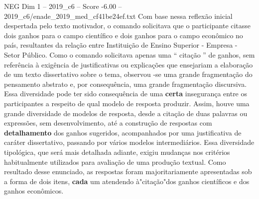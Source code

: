 \begin{textsample}{NEG Dim 1 – 2019\_c6 – Score -6.00 – 2019\_c6/enade\_2019\_med\_cf41be24ef.txt}
Com base nessa reflexão inicial despertada pelo texto motivador, o comando solicitava que o participante citasse dois ganhos para o campo científico e dois ganhos para o campo econômico no país, resultantes da relação entre Instituição de Ensino Superior - Empresa - Setor Público.
Como o comando solicitava apenas uma “ citação ” de ganhos, sem referência à exigência de justificativas ou explicações que ensejariam a elaboração de um texto dissertativo sobre o tema, observou -se uma grande fragmentação do pensamento abstrato e, por consequência, uma grande fragmentação discursiva.
Essa diversidade pode ter sido consequência de uma \textbf{certa} insegurança entre os participantes a respeito de qual modelo de resposta produzir.
Assim, houve uma grande diversidade de modelos de resposta, desde a citação de duas palavras ou expressões, sem desenvolvimento, até a construção de respostas com \textbf{detalhamento} dos ganhos sugeridos, acompanhados por uma justificativa de caráter dissertativo, passando por vários modelos intermediários.
Essa diversidade tipológica, que será mais detalhada adiante, exigiu mudanças nos critérios habitualmente utilizados para avaliação de uma produção textual.
Como resultado desse enunciado, as respostas foram majoritariamente apresentadas sob a forma de dois itens, \textbf{cada} um atendendo à"citação"dos ganhos científicos e dos ganhos econômicos.

\end{textsample}
